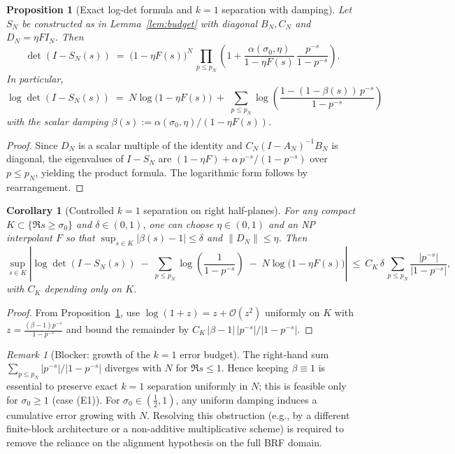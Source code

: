 \documentclass[11pt]{article}
\newtheorem{proposition}[theorem]{Proposition}
\newtheorem{corollary}[theorem]{Corollary}
\theoremstyle{remark}
\newtheorem{remark}[theorem]{Remark}
\begin{document}
\begin{proposition}[Exact log-det formula and $k=1$ separation with damping]\label{prop:logdet-S}
Let $S_N$ be constructed as in Lemma~\ref{lem:budget} with diagonal $B_N,C_N$ and $D_N=\eta F I_N$. Then
\[
 \det(I-S_N(s))\;=\;\big(1-\eta F(s)\big)^{N}\,\prod_{p\le p_N}\left(1+\frac{\alpha(\sigma_0,\eta)}{1-\eta F(s)}\,\frac{p^{-s}}{1-p^{-s}}\right).
\]
In particular,
\[
 \log\det(I-S_N(s))\;=\;N\log\big(1-\eta F(s)\big)\; +\; \sum_{p\le p_N}\log\left(\frac{1-(1-\beta(s))\,p^{-s}}{1-p^{-s}}\right)
\]
with the scalar damping $\beta(s):=\alpha(\sigma_0,\eta)/(1-\eta F(s))$.
\end{proposition}
\begin{proof}
Since $D_N$ is a scalar multiple of the identity and $C_N(I-A_N)^{-1}B_N$ is diagonal, the eigenvalues of $I-S_N$ are $(1-\eta F)+\alpha\, p^{-s}/(1-p^{-s})$ over $p\le p_N$, yielding the product formula. The logarithmic form follows by rearrangement.
\end{proof}

\begin{corollary}[Controlled $k=1$ separation on right half-planes]
For any compact $K\subset\{\Re s\ge \sigma_0\}$ and $\delta\in(0,1)$, one can choose $\eta\in(0,1)$ and an NP interpolant $F$ so that $\sup_{s\in K}|\beta(s)-1|\le \delta$ and $\|D_N\|\le \eta$. Then
\[
 \sup_{s\in K}\left|\log\det(I-S_N(s))\; -\; \sum_{p\le p_N}\log\!\left(\frac{1}{1-p^{-s}}\right)\; -\;N\log\big(1-\eta F(s)\big)\right|\ \le\ C_K\,\delta\,\sum_{p\le p_N}\frac{|p^{-s}|}{|1-p^{-s}|},
\]
with $C_K$ depending only on $K$.
\end{corollary}
\begin{proof}
From Proposition~\ref{prop:logdet-S}, use $\log(1+z)=z+\mathcal O(z^2)$ uniformly on $K$ with $z=\tfrac{(\beta-1)p^{-s}}{1-p^{-s}}$ and bound the remainder by $C_K\,|\beta-1|\,|p^{-s}|/|1-p^{-s}|$.
\end{proof}

\begin{remark}[Blocker: growth of the $k=1$ error budget]
The right-hand sum $\sum_{p\le p_N} |p^{-s}|/|1-p^{-s}|$ diverges with $N$ for $\Re s\le 1$. Hence keeping $\beta\equiv 1$ is essential to preserve exact $k=1$ separation uniformly in $N$; this is feasible only for $\sigma_0\ge 1$ (case (E1)). For $\sigma_0\in(\tfrac12,1)$, any uniform damping induces a cumulative error growing with $N$. Resolving this obstruction (e.g., by a different finite-block architecture or a non-additive multiplicative scheme) is required to remove the reliance on the alignment hypothesis on the full BRF domain.
\end{remark}
\end{document}
